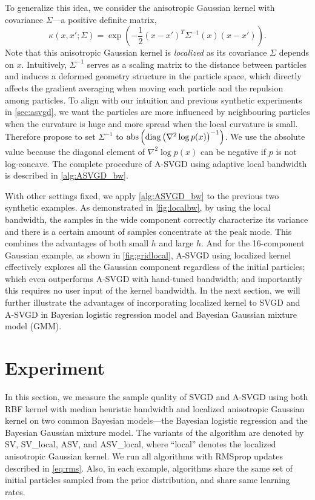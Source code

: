 To generalize this idea, we consider the anisotropic Gaussian kernel with covariance $\Sigma$---a positive definite matrix,
\[
\kappa(x, x'; \Sigma) = \exp\left(-\frac{1}{2}(x - x')^T \Sigma^{-1}(x)(x- x')  \right).  
\]
Note that this anisotropic Gaussian kernel is \emph{localized} as its covariance $\Sigma$ depends on $x$. 
Intuitively, $\Sigma^{-1}$ serves as a scaling matrix to the distance between particles and induces a deformed geometry structure in the particle space, which directly affects the gradient averaging when moving each particle and the repulsion among particles.  To align with our intuition and previous synthetic experiments in \cref{sec:asvgd}, we want the particles are more influenced by neighbouring particles when the curvature is huge and more spread when the local curvature is small. Therefore propose to set $\Sigma^{-1}$ to $\text{abs}\left( \operatorname{diag} \left(\nabla^2 \log p(x) \right)^{-1}\right)$. We use the absolute value because the diagonal element of $\nabla^2 \log p(x)$ can be negative if $p$ is not log-concave. The complete procedure of A-SVGD
using adaptive local bandwidth is described in \cref{alg:ASVGD_bw}.




With other settings fixed, we apply \cref{alg:ASVGD_bw} to the previous two
synthetic examples. As demonstrated in \cref{fig:localbw}, by using the local
bandwidth, the samples in the wide component correctly characterize its
variance and there is a certain amount of samples concentrate at the peak
mode. This combines the advantages of both small $h$ and large $h$. And for
the 16-component Gaussian example, as shown in
\cref{fig:gridlocal}, A-SVGD using localized kernel effectively explores all
the Gaussian component regardless of the initial particles; which even
outperforms A-SVGD with hand-tuned bandwidth; and importantly this requires
no user input of the kernel bandwidth.
In the next section, we will further illustrate the advantages of incorporating
localized kernel to SVGD and A-SVGD in Bayesian logistic regression model
and Bayesian Gaussian mixture model (GMM). 


\section{Experiment} \label{sec:expt}

In this section, we measure the sample quality of SVGD and A-SVGD using both
RBF kernel with median heuristic bandwidth and localized anisotropic
Gaussian kernel on two common Bayesian models---the Bayesian logistic
regression and the Bayesian Gaussian mixture model. The variants of the algorithm are denoted by
SV, SV\_local, ASV, and ASV\_local, where ``local'' denotes the localized
anisotropic Gaussian kernel. We run all algorithms with RMSprop updates described in \cref{eq:rms}. Also, in each example, algorithms share the same
set of initial particles sampled from the prior distribution, and share same learning rates.


